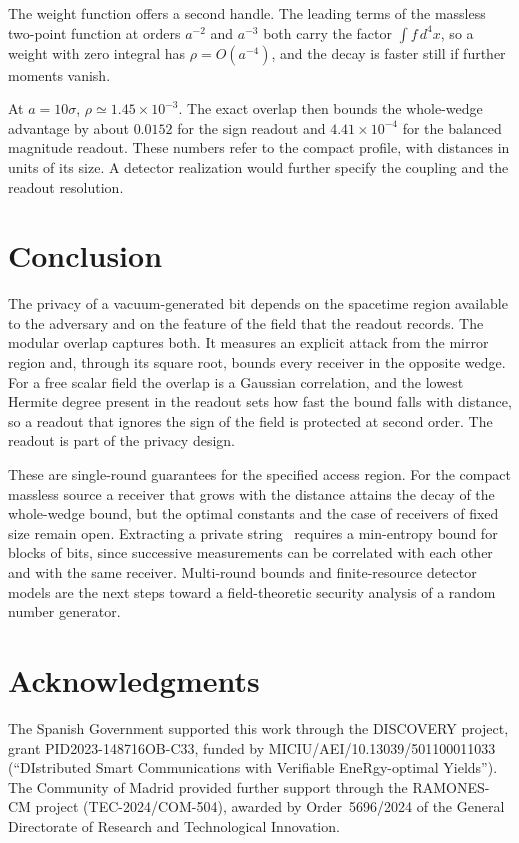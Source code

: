 \documentclass[11pt,a4paper]{article}
\begin{document}
The weight function offers a second handle. The leading terms of the massless two-point function at orders $a^{-2}$ and $a^{-3}$ both carry the factor $\int f\,d^4x$, so a weight with zero integral has $\rho=O(a^{-4})$, and the decay is faster still if further moments vanish.

At $a=10\sigma$, $\rho\simeq1.45\times10^{-3}$. The exact overlap then bounds the whole-wedge advantage by about $0.0152$ for the sign readout and $4.41\times10^{-4}$ for the balanced magnitude readout. These numbers refer to the compact profile, with distances in units of its size. A detector realization would further specify the coupling and the readout resolution.

\section{Conclusion}
\label{sec:discussion}

The privacy of a vacuum-generated bit depends on the spacetime region available to the adversary and on the feature of the field that the readout records. The modular overlap captures both. It measures an explicit attack from the mirror region and, through its square root, bounds every receiver in the opposite wedge. For a free scalar field the overlap is a Gaussian correlation, and the lowest Hermite degree present in the readout sets how fast the bound falls with distance, so a readout that ignores the sign of the field is protected at second order. The readout is part of the privacy design.

These are single-round guarantees for the specified access region. For the compact massless source a receiver that grows with the distance attains the decay of the whole-wedge bound, but the optimal constants and the case of receivers of fixed size remain open. Extracting a private string~\cite{tomamichel2011leftover,berta2016smooth} requires a min-entropy bound for blocks of bits, since successive measurements can be correlated with each other and with the same receiver. Multi-round bounds and finite-resource detector models are the next steps toward a field-theoretic security analysis of a random number generator.

\section*{Acknowledgments}
The Spanish Government supported this work through the DISCOVERY project, grant PID2023-148716OB-C33, funded by MICIU/AEI/10.13039/501100011033 (``DIstributed Smart Communications with Verifiable EneRgy-optimal Yields''). The Community of Madrid provided further support through the RAMONES-CM project (TEC-2024/COM-504), awarded by Order~5696/2024 of the General Directorate of Research and Technological Innovation.
\end{document}
